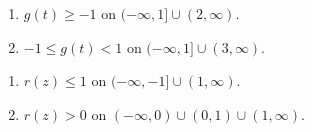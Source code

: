 \documentclass{ximera}
\begin{document}
\begin{multicols}{2}
\begin{enumerate}
\setcounter{enumi}{\value{HW}}

\item  $g(t) \geq -1$ on $(-\infty, 1] \cup (2, \infty)$.
\item  $-1 \leq g(t) < 1$ on $(-\infty, 1] \cup (3, \infty)$.

\setcounter{HW}{\value{enumi}}
\end{enumerate}
\end{multicols}

\begin{multicols}{2}
\begin{enumerate}
\setcounter{enumi}{\value{HW}}

\item  $r(z) \leq 1$ on $(-\infty, -1] \cup (1, \infty)$.

\item  $r(z) > 0$ on $(-\infty, 0) \cup (0,1) \cup (1, \infty)$.


\setcounter{HW}{\value{enumi}}
\end{enumerate}
\end{multicols}
\end{document}
